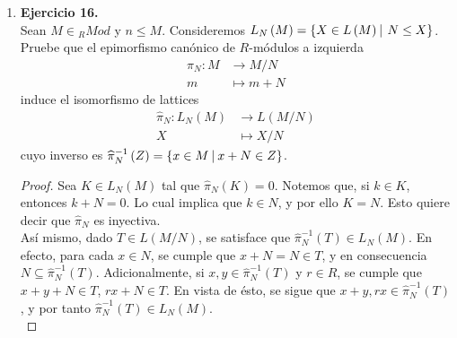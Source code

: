 \documentclass{article}
\newcommand{\lrprth}[1]{
    \left(#1\right)
}
\newcommand{\descset}[3]{
    \left\{#1\in#2\ \vline\ #3\right\}
}
\newcommand{\descapp}[6]{
    #1: #2 &\rightarrow #3\\
    #4 &\mapsto #5#6 
}
\theoremstyle{definition}
\theoremstyle{plain}
\theoremstyle{plain}
\theoremstyle{definition}
\theoremstyle{definition}
\theoremstyle{definition}
\theoremstyle{definition}
\theoremstyle{definition}
\theoremstyle{definition}
\begin{document}
\begin{enumerate}[label=\textbf{Ej \arabic*.}]
\begin{proof}
		$\boxed{\Leftarrow )}$ Consideremos que $f$ es un isomorfismo de posets. Entonces existe $g:L' \longrightarrow L$ un morfismo de posets tal que $f \circ g = Id_{L'}$ y $g \circ f = Id_{L}$. Veremos que $g$ es un morfismo de latices. Sean así $r,t  \in L'$. Dado que $r \wedge t \leq ' r$ y $r \wedge t \leq ' t$, se tiene que $g\lrprth{r \wedge t} \leq g\lrprth{r}$ y $g\lrprth{r \wedge t} \leq g\lrprth{t}$, y por ende $g\lrprth{r \wedge t} \leq g\lrprth{r} \wedge g\lrprth{t}$. Posteriormente, usando el hecho de que $f$ es morfismo de lattices, se deduce que
		\begin{align*}
			r \wedge t = f\lrprth{g\lrprth{r \wedge t}}\\
			\leq' f\lrprth{g\lrprth{r} \wedge g\lrprth{t}}\\
			=f\lrprth{g\lrprth{r}} \wedge f\lrprth{g\lrprth{t}}\\
			=r \wedge t
		\end{align*}
		De este modo,
		\begin{align*}
			g\lrprth{r \wedge t} = g\lrprth{f\lrprth{g\lrprth{r} \wedge g\lrprth{t}}}\\
			=g\lrprth{r} \wedge g\lrprth{t}
		\end{align*}
		Dado que $g$ es morfismo de lattices, podemos concluir que la afirmación es cierta.
	\end{proof}

	\item\textbf{Ejercicio 16.}\\
	Sean $M \in {}_{R}Mod$ y $n \leq M$. Consideremos $L_{N}\lrprth{M}=\descset{X}{L\lrprth{M}}{N \leq X}$. Pruebe que el epimorfismo canónico de $R$-módulos a izquierda
	\begin{align*}
		\descapp{\pi_{N}}{M}{M/N}{m}{m+N}{ }
	\end{align*}
	induce el isomorfismo de lattices
	\begin{align*}
		\descapp{\widehat{\pi}_{N}}{L_{N}\lrprth{M}}{L\lrprth{M/N}}{X}{X/N}{ }
	\end{align*}
	cuyo inverso es $\widehat{\pi}_{N}^{-1} \lrprth{Z}=\descset{x}{M}{x+N \in Z}$.
	\begin{proof}
		Sea $K \in L_{N}\lrprth{M}$ tal que $\widehat{\pi}_{N} \lrprth{K}=0$. Notemos que, si $k \in K$, entonces $k+N=0$. Lo cual implica que $k \in N$, y por ello $K=N$. Esto quiere decir que $\widehat{\pi}_{N}$ es inyectiva.\\

		Así mismo, dado $T \in L\lrprth{M/N}$, se satisface que $\widehat{\pi}_{N}^{-1} \lrprth{T} \in L_{N} \lrprth{M}$. En efecto, para cada $x \in N$, se cumple que $x+N=N \in T$, y en consecuencia $N \subseteq \widehat{\pi}_{N}^{-1} \lrprth{T}$. Adicionalmente, si $x,y \in \widehat{\pi}_{N}^{-1}\lrprth{T}$ y $r \in R$, se cumple que $x+y+N \in T$, $rx+N \in T$. En vista de ésto, se sigue que $x+y, rx \in \widehat{\pi}_{N}^{-1} \lrprth{T}$, y por tanto $\widehat{\pi}_{N}^{-1} \lrprth{T} \in L_{N} \lrprth{M}$.\\


\end{proof}
\end{enumerate}
\end{document}
